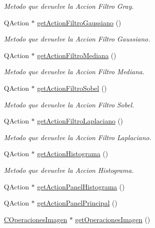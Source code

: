 \begin{DoxyCompactItemize}
\begin{DoxyCompactList}\small\item\em Metodo que devuelve la Accion Filtro Gray. \end{DoxyCompactList}\item 
Q\+Action $\ast$ \hyperlink{classCAplicacion_a5929e30f259ac77d0f72a8fbd1cb89c7}{get\+Action\+Filtro\+Gaussiano} ()
\begin{DoxyCompactList}\small\item\em Metodo que devuelve la Accion Filtro Gaussiano. \end{DoxyCompactList}\item 
Q\+Action $\ast$ \hyperlink{classCAplicacion_a8439aed96fa9a5a80f37be6b2dd67f4b}{get\+Action\+Filtro\+Mediana} ()
\begin{DoxyCompactList}\small\item\em Metodo que devuelve la Accion Filtro Mediana. \end{DoxyCompactList}\item 
Q\+Action $\ast$ \hyperlink{classCAplicacion_a4c7a3e1bf75bee8ba9a8c6a092c4b55e}{get\+Action\+Filtro\+Sobel} ()
\begin{DoxyCompactList}\small\item\em Metodo que devuelve la Accion Filtro Sobel. \end{DoxyCompactList}\item 
Q\+Action $\ast$ \hyperlink{classCAplicacion_a9e3487513378f95c231dd8806222f126}{get\+Action\+Filtro\+Laplaciano} ()
\begin{DoxyCompactList}\small\item\em Metodo que devuelve la Accion Filtro Laplaciano. \end{DoxyCompactList}\item 
Q\+Action $\ast$ \hyperlink{classCAplicacion_a297c40499e1dc0a7fe428846df8b37b6}{get\+Action\+Histograma} ()
\begin{DoxyCompactList}\small\item\em Metodo que devuelve la Accion Histograma. \end{DoxyCompactList}\item 
Q\+Action $\ast$ \hyperlink{classCAplicacion_a442ce7bf9b9981753e511c0ac32726db}{get\+Action\+Panel\+Histograma} ()
\item 
Q\+Action $\ast$ \hyperlink{classCAplicacion_a68e3eb2b19973dc749caff2c10c92bb4}{get\+Action\+Panel\+Principal} ()
\item 
\hyperlink{classCOperacionesImagen}{C\+Operaciones\+Imagen} $\ast$ \hyperlink{classCAplicacion_acf0f5ed748482f7957bee4db4dadf840}{get\+Operaciones\+Imagen} ()

\end{DoxyCompactItemize}
